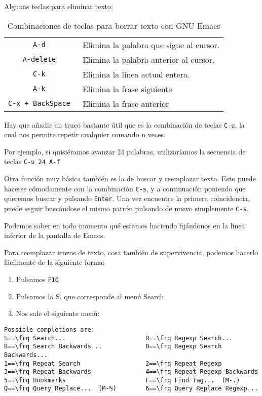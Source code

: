 Algunas teclas para eliminar texto:

\begin{table}[htbp]
\centering
\begin{tabular}{|c|l|}
\hline
{\tt A-d }      & Elimina la palabra que sigue al cursor. \\
{\tt A-delete } & Elimina la palabra anterior al cursor. \\
{\tt C-k }      & Elimina la línea actual entera. \\
{\tt A-k }      & Elimina la frase siguiente \\
{\tt C-x + BackSpace } & Elimina la frase anterior \\
\hline
\end{tabular}
\caption{Combinaciones de teclas para borrar texto con GNU Emacs}
\end{table}

Hay que añadir un truco bastante  útil que es la combinación de teclas
{\tt C-u}, la cual nos permite repetir cualquier comando n veces.

Por  ejemplo, si  quisiéramos  avanzar 24  palabras, utilizaríamos  la
secuencia de teclas {\tt C-u 24 A-f}

Otra función  muy básica también es  la de buscar y  reemplazar texto.
Esto  puede hacerse  cómodamente con  la  combinación {\tt  C-s}, y  a
continuación poniendo que queremos buscar  y pulsando {\tt Enter}. Una
vez encuentre  la primera coin\-ci\-den\-cia, puede  seguir buscándose
el mismo patrón pulsando de nuevo simplemente {\tt C-s}.

Podemos saber  en todo momento  qué estamos haciendo fijándonos  en la
línea inferior de la pantalla de Emacs.

Para  reemplazar  trozos  de  texto, cosa  también  de  supervivencia,
podemos hacerlo fácilmente de la siguiente forma:

\begin{enumerate}
\item Pulsamos {\tt F10}
\item Pulsamos la S, que corresponde al menú Search
\item Nos sale el siguiente menú:
\end{enumerate}

\begin{verbatim}
Possible completions are:
S==\frq Search...                      R==\frq Regexp Search...
B==\frq Search Backwards...            0==\frq Regexp Search Backwards...
1==\frq Repeat Search                  2==\frq Repeat Regexp
3==\frq Repeat Backwards               4==\frq Repeat Regexp Backwards
5==\frq Bookmarks                      F==\frq Find Tag...  (M-.)
Q==\frq Query Replace...  (M-%)        6==\frq Query Replace Regexp...
\end{verbatim}

